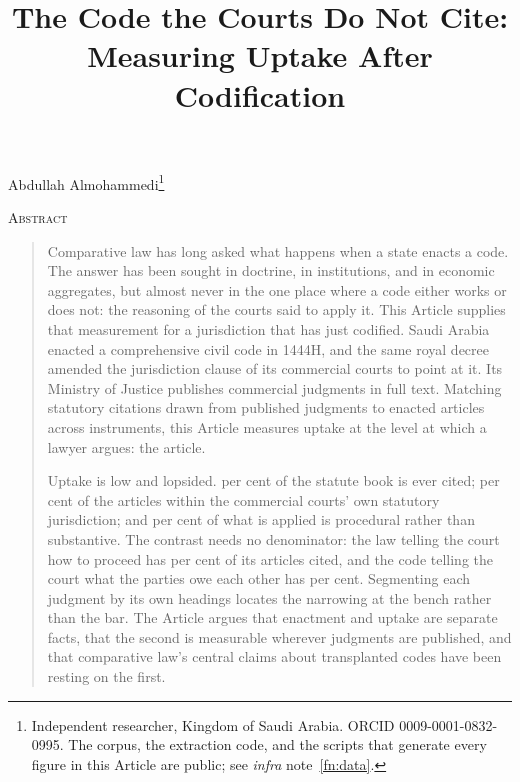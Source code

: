 \documentclass[12pt]{article}
\title{\large\bfseries The Code the Courts Do Not Cite:\\
Measuring Uptake After Codification}
\date{}
\newif\ifanon
\begin{document}
\doublespacing
\maketitle
\thispagestyle{empty}

\begin{center}
\ifanon\else
Abdullah Almohammedi\footnote{Independent researcher, Kingdom of Saudi
Arabia. ORCID 0009-0001-0832-0995. The corpus, the extraction code, and the
scripts that generate every figure in this Article are public; see
\emph{infra} note~\ref{fn:data}.}
\fi
\end{center}

\vspace{1em}

\begin{center}\textsc{Abstract}\end{center}
\begin{quote}
\singlespacing\noindent
Comparative law has long asked what happens when a state enacts a code. The
answer has been sought in doctrine, in institutions, and in economic
aggregates, but almost never in the one place where a code either works or
does not: the reasoning of the courts said to apply it. This Article supplies
that measurement for a jurisdiction that has just codified. Saudi Arabia
enacted a comprehensive civil code in 1444H, and the same royal decree
amended the jurisdiction clause of its commercial courts to point at it. Its
Ministry of Justice publishes commercial judgments in full text. Matching
\nCitations{} statutory citations drawn from \nJudgments{} published judgments
to \nRegistryArticles{} enacted articles across \nInstruments{} instruments,
this Article measures uptake at the level at which a lawyer argues: the
article.

Uptake is low and lopsided. \nArticlesCitedShare{} per cent of the statute
book is ever cited; \nScopeNarrowShare{} per cent of the articles within the
commercial courts' own statutory jurisdiction; and \nProceduralShare{} per
cent of what is applied is procedural rather than substantive. The contrast
needs no denominator: the law telling the court how to proceed has
\nCCLShare{} per cent of its articles cited, and the code telling the court
what the parties owe each other has \nCivilShare{} per cent. Segmenting each
judgment by its own headings locates the narrowing at the bench rather than
the bar. The Article argues that enactment and uptake are separate facts, that
the second is measurable wherever judgments are published, and that
comparative law's central claims about transplanted codes have been resting
on the first.
\end{quote}
\end{document}
